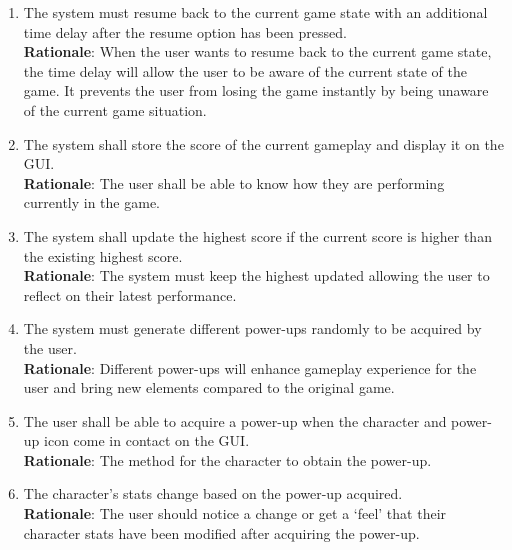 \documentclass[12pt, titlepage]{article}
\begin{document}
\begin{enumerate}
	\item The system must resume back to the current game state with an additional time delay after the resume option has been pressed.\\
	\textbf{Rationale}: When the user wants to resume back to the current game state, the time delay will allow the user to be aware of the current state of the game. It prevents the user from losing the game instantly by being unaware of the current game situation. 
	
	\item The system shall store the score of the current gameplay and display it on the GUI. \\
	\textbf{Rationale}: The user shall be able to know how they are performing currently in the game.
	\item The system shall update the highest score if the current score is higher than the existing highest score.\\
	\textbf{Rationale}: The system must keep the highest updated allowing the user to reflect on their latest performance.
	\item The system must generate different power-ups randomly to be acquired by the user.\\
	\textbf{Rationale}: Different power-ups will enhance gameplay experience for the user and bring new elements compared to the original game.
	
	\item The user shall be able to acquire a power-up when the character and power-up icon come in contact on the GUI.\\
	\textbf{Rationale}: The method for the character to obtain the power-up.
	\item The character's stats change based on the power-up acquired.\\
	\textbf{Rationale}: The user should notice a change or get a `feel' that their character stats have been modified after acquiring the power-up.
	

\end{enumerate}
\end{document}

